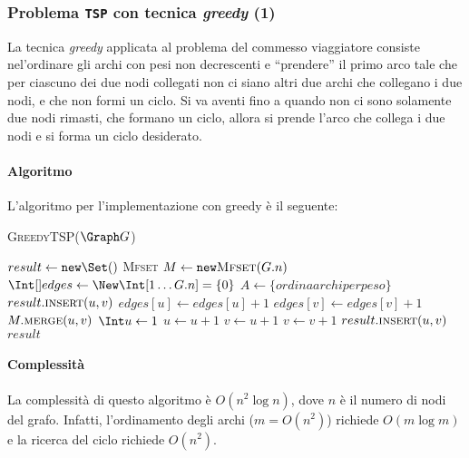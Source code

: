     \subsubsection{Problema \texttt{TSP} con tecnica \textit{greedy} (1)}
        La tecnica \textit{greedy} applicata al problema del commesso viaggiatore consiste nel'ordinare gli archi con pesi non decrescenti e ``prendere'' il primo arco tale che per ciascuno dei due nodi collegati non ci siano altri due archi che collegano i due nodi, e che non formi un ciclo. Si va aventi fino a quando non ci sono solamente due nodi rimasti, che formano un ciclo, allora si prende l'arco che collega i due nodi e si forma un ciclo desiderato.
        \paragraph{Algoritmo} L'algoritmo per l'implementazione con greedy è il seguente:
        \begin{algorithm}[H]
            \caption{\Set \textsc{GreedyTSP}($\Graph G$)}
            \begin{algorithmic}
                \State \Set $result \gets \texttt{new} \Set()$
                \State \textsc{Mfset} $M \gets \texttt{new} \textsc{Mfset}(G.n)$
                \State $\Int[] edges \gets \New \Int [1\dots G.n] =\{0\}$
                \State $A \gets \{ordina archi per peso\}$
                        \State $result.\Call{insert}{u,v}$
                        \State $edges[u] \gets edges[u]+1$
                        \State $edges[v] \gets edges[v]+1$
                        \State $M.\Call{merge}{u,v}$
                    \EndIf
                \EndFor
                \State $\Int u \gets 1$
                    $u\gets u+1$
                \EndWhile
                \State \Int $v \gets u+1$
                    $v\gets v+1$
                \EndWhile
                \State $result.\Call{insert}{u,v}$
                \State \Return $result$
            \end{algorithmic}
        \end{algorithm}
        \paragraph{Complessità} La complessità di questo algoritmo è $O(n^2\log n)$, dove $n$ è il numero di nodi del grafo. Infatti, l'ordinamento degli archi ($m=O(n^2)$) richiede $O(m\log m)$ e la ricerca del ciclo richiede $O(n^2)$.
